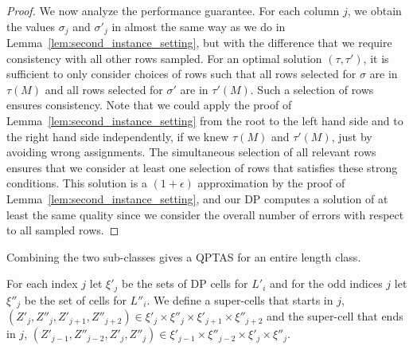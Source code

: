\begin{proof}
    We now analyze the performance guarantee. 
    For each column $j$, we obtain the values $\sigma_j$ and $\sigma'_j$ in almost the same way as we do in Lemma~\ref{lem:second_instance_setting}, but with the difference that we require consistency with all other rows sampled.
    For an optimal solution $(\tau,\tau')$, it is sufficient to only consider choices of rows such that all rows selected for $\sigma$ are in $\tau(M)$ and all rows selected for $\sigma'$ are in $\tau'(M)$.
    Such a selection of rows ensures consistency. 
    Note that we could apply the proof of Lemma~\ref{lem:second_instance_setting}  from the root to the left hand side and to the right hand side independently,
    if we knew $\tau(M)$ and $\tau'(M)$, just by avoiding wrong assignments.
    The simultaneous selection of all relevant rows ensures that we consider at least one selection of rows that satisfies these strong conditions.
    This solution is a $(1+\epsilon)$ approximation by the proof of Lemma~\ref{lem:second_instance_setting}, and
    our DP computes a solution of at least the same quality since we consider the overall number of errors with respect to all sampled rows.
\end{proof}

Combining the two sub-classes gives a QPTAS for an entire length class.

\begin{definition}
    For each index $j$ let $\xi'_j$ be the sets of DP cells for $L'_i$ and for the odd indices $j$ let $\xi''_j$ be the set of cells for $L''_i$.
    We define a super-cells that starts in $j$, $(Z'_j,Z''_j,Z'_{j+1},Z''_{j+2}) \in \xi'_j \times \xi''_j \times \xi'_{j+1} \times \xi''_{j+2}$ and the super-cell that ends in $j$, $(Z'_{j-1},Z''_{j-2},Z'_j,Z''_j) \in \xi'_{j-1} \times \xi''_{j-2} \times \xi'_{j} \times \xi''_{j}$.
 \label{def:dp-whole-length-class}
\end{definition}


